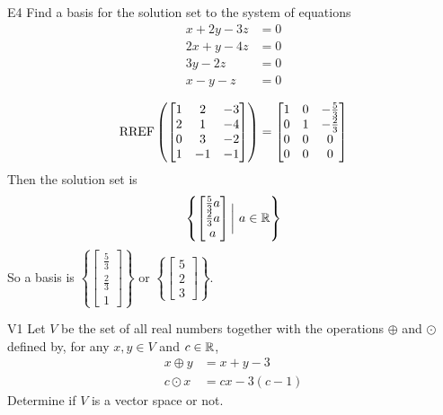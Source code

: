 \documentclass{sbgLAquiz}
\begin{document}
\begin{extract}\newpage\end{extract}
\begin{problem}{E4}
Find a basis for the solution set to the system of equations
\begin{align*}
x+2y-3z &= 0 \\
2x+y-4z &= 0 \\
3y -2z & = 0 \\
x -y -z &= 0
\end{align*}
\end{problem}
\begin{solution}
$$\operatorname{RREF} \left(\begin{bmatrix} 1 & 2 & -3 \\ 2 & 1 & -4 \\ 0 & 3 & -2 \\ 1 & -1 & -1 \end{bmatrix} \right) = \begin{bmatrix} 1 & 0 & -\frac{5}{3} \\ 0 & 1 & -\frac{2}{3} \\ 0 & 0 & 0 \\ 0 & 0 & 0 \end{bmatrix}$$
Then the solution set is
$$\left\{ \begin{bmatrix} \frac{5}{3}a \\ \frac{2}{3}a \\ a \end{bmatrix} \bigg|\ a \in \mathbb{R} \right\}$$
So a basis is $\left\{ \begin{bmatrix} \frac{5}{3} \\ \frac{2}{3} \\ 1 \end{bmatrix} \right\}$ or $\left\{ \begin{bmatrix} 5 \\  2 \\ 3 \end{bmatrix} \right\}$.
\end{solution}

\begin{problem}{V1}
Let $V$ be the  set of all real numbers together with the operations $\oplus$ and $\odot$ defined by, for any $x,y \in V$ and $c \in \mathbb{R}$,
\begin{align*}
x\oplus y  &= x+y-3 \\
c \odot x &= cx-3(c-1)
\end{align*}
Determine if $V$ is a vector space or not.
\end{problem}
\end{document}
